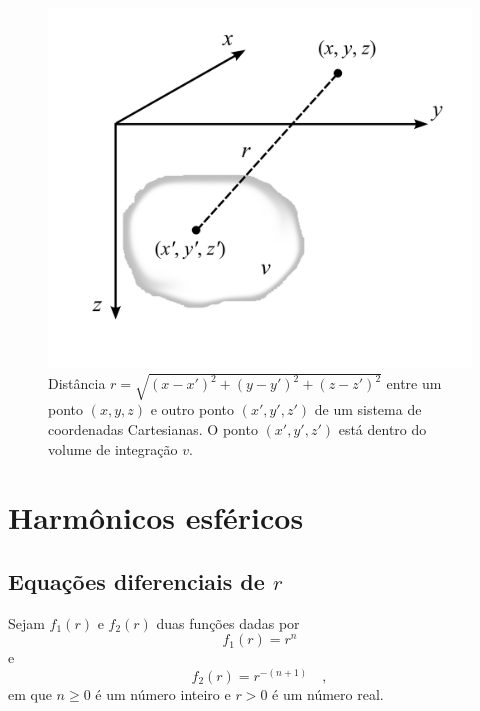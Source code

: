 \documentclass[10pt,a4paper,fleqn]{article}
\begin{document}
\begin{figure}[h]
    \centering
    \includegraphics[scale=1]{Figs/Fig1.png}
    \caption{Dist\^{a}ncia $r = \sqrt{(x-x')^{2}+(y-y')^{2}+(z-z')^{2}}$ entre
        um ponto $(x,y,z)$ e outro ponto $(x',y',z')$ de um sistema de coordenadas Cartesianas. O ponto
        $(x',y',z')$ est\'{a} dentro do volume de integraç\~{a}o $v$.}   
    \label{fig:fig1}
\end{figure}

\section{Harm\^{o}nicos esf\'{e}ricos}

\subsection{Equaç\~{o}es diferenciais de $r$}

Sejam $f_{1}(r)$ e $f_{2}(r)$ duas funç\~{o}es dadas por
\begin{equation}
f_{1}(r) = r^{n}
\label{eq:ex211-r^}
\end{equation}
e
\begin{equation}
f_{2}(r) = r^{-(n+1)} \quad ,
\label{eq:ex211-r_}
\end{equation}
em que $n \geqslant 0$ \'{e} um n\'{u}mero inteiro e $r > 0$ \'{e} um n\'{u}mero real. 
\end{document}
